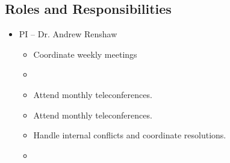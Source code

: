 \subsection{Roles and Responsibilities}
\label{sec:Roles}
\begin{itemize}
\item PI – Dr. Andrew Renshaw
	\begin{itemize}
	\item Coordinate weekly meetings
	\item
	\item Attend monthly teleconferences.
	\item Attend monthly teleconferences.
	\item Handle internal conflicts and coordinate resolutions.
	\item 
	\end{itemize}	 
%
\end{itemize}

